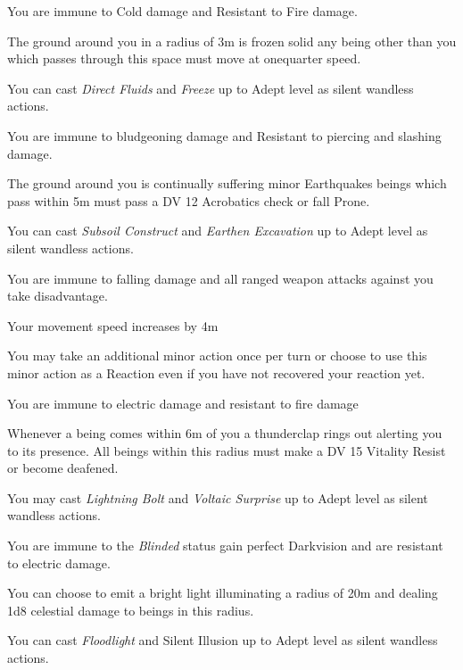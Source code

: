 \begin{multicols}{3}
{
{
\item You are immune to Cold damage and Resistant to Fire damage. 
\item The ground around you in a radius of 3m is frozen solid\comma{} any being other than you which passes through this space must move at one\minus{}quarter speed. 
\item You can cast {\it Direct Fluids} and {\it Freeze} up to Adept level as silent\comma{} wandless actions. 
}

{
\item You are immune to bludgeoning damage and Resistant to piercing and slashing damage.
\item The ground around you is continually suffering minor Earthquakes\comma{} beings which pass within 5m must pass a DV 12 Acrobatics check or fall Prone. 
\item You can cast {\it Subsoil Construct} and {\it Earthen Excavation} up to Adept level as silent\comma{} wandless actions. 
}

{
\item You are immune to falling damage and all ranged weapon attacks against you take disadvantage. 
\item Your movement speed increases by 4m 
\item You may take an additional minor action once per turn\comma{} or choose to use this minor action as a Reaction even if you have not recovered your reaction yet. 
}

{
\item You are immune to electric damage and resistant to fire damage
\item Whenever a being comes within 6m of you\comma{} a thunderclap rings out\comma{} alerting you to its presence. All beings within this radius must make a DV 15 Vitality Resist\comma{} or become deafened. 
\item You may cast {\it Lightning Bolt} and {\it Voltaic Surprise} up to Adept level as silent\comma{} wandless actions. 
}

{
\item You are immune to the {\it Blinded} status\comma{} gain perfect Darkvision and are resistant to electric damage. 
\item You can choose to emit a bright light\comma{} illuminating a radius of 20m and dealing 1d8 celestial damage to beings in this radius. 
\item You can cast {\it Floodlight} and {Silent Illusion} up to Adept level as silent\comma{} wandless actions. 
}
}



\end{multicols}
